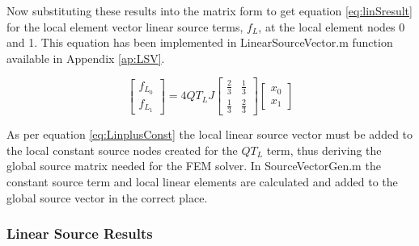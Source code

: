 \documentclass[11pt]{article}
\begin{document}
Now substituting these results into the matrix form to get equation \ref{eq:linSresult} for the local element vector linear source terms, $f_L$, at the local element nodes 0 and 1. This equation has been implemented in LinearSourceVector.m function available in Appendix \ref{ap:LSV}.


\begin{equation} \label{eq:linSresult}
\begin{bmatrix}
f_{L_0}\\[1ex]
 f_{L_1} 
\end{bmatrix}
= 4QT_L J 
\begin{bmatrix}
\frac{2}{3} & \frac{1}{3}  \\[1ex]
 \frac{1}{3}  & \frac{2}{3}
\end{bmatrix}
\begin{bmatrix}
x_{0} \\[1ex] x_{1} 
\end{bmatrix}
\end{equation}


As per equation \ref{eq:LinplusConst} the local linear source vector must be added to the local constant source nodes created for the $QT_L$ term, thus deriving the global source matrix needed for the FEM solver. In SourceVectorGen.m the constant source term and local linear elements are calculated and added to the global source vector in the correct place.

\pagebreak
\subsubsection{Linear Source Results}
\end{document}
